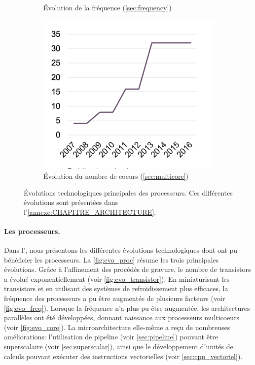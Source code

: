 \begin{figure}[t!]
\begin{subfigure}[t]{0.33\textwidth}
                \caption{\label{fig:evo_freq}Évolution de la fréquence (\autoref{sec:frequency})}
            \end{subfigure}\hfill
            \begin{subfigure}[t]{0.33\textwidth}
                    \centering
                    \includegraphics[width=\linewidth]{images/evo_core.png}
                    \caption{\label{fig:evo_core}Évolution du nombre de coeurs (\autoref{sec:multicore})}
            \end{subfigure}
            \caption{\label{fig:evo_proc}Évolutions technologiques principales des processeurs. Ces différentes évolutions sont présentées dans l'\autoref{annexe:CHAPITRE_ARCHITECTURE}.}
        \end{figure}
        
            \paragraph{Les processeurs.} Dans l', nous présentons les différentes évolutions technologiques dont ont pu bénéficier les processeurs. La \autoref{fig:evo_proc} résume les trois principales évolutions.
            Grâce à l'affinement des procédés de gravure, le nombre de transistors a évolué exponentiellement (voir \autoref{fig:evo_transistor}).  
            En miniaturisant les transistors et en utilisant des systèmes de refroidissement plus efficaces, la fréquence des processeurs a pu être augmentée de plusieurs facteurs (voir \autoref{fig:evo_freq}).
            Lorsque la fréquence n'a plus pu être augmentée, les architectures parallèles ont été développées, donnant naissance aux processeurs multicoeurs (voir \autoref{fig:evo_core}). La microarchitecture elle-même a reçu de nombreuses améliorations: l'utilisation de pipeline (voir \autoref{sec:pipeline}) pouvant être superscalaire (voir \autoref{sec:superscalar}), ainsi que le développement d'unités de calculs pouvant exécuter des instructions vectorielles (voir \autoref{sec:cpu_vectoriel}).
            
